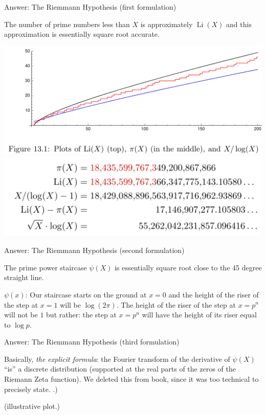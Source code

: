 \documentclass{beamer}
\DeclareMathOperator{\Li}{Li}
\begin{document}
\begin{frame}{Answer: The Riemmann Hypothesis (first formulation)}
  \begin{block}{}
    The number of prime numbers less than $X$ is
    approximately $\Li(X)$ and this approximation is essentially square
    root accurate.
  \end{block}
  \begin{center}
    \includegraphics[width=.5\textwidth]{pics/plot-pi-Li.png}
    \includegraphics[width=.5\textwidth]{pics/ten24.png}
  \end{center}
\end{frame}

\begin{frame}{Answer: The Riemmann Hypothesis  (second formulation)}
  \begin{block}{}
    The prime power staircase $\psi(X)$ is essentially square root close
    to the 45 degree straight line.
  \end{block}

  $\psi(x)$: Our staircase starts on the ground at $x=0$ and the height of the
  riser of the step at $x=1$ will be $\log(2\pi)$. The height of the
  riser of the step at $x=p^n$ will not be $1$
  but rather: the step at $x=p^n$ will have the height of its riser
  equal to $\log p$.


\end{frame}

\begin{frame}{Answer: The Riemmann Hypothesis (third formulation)}
  \begin{block}{}
    Basically, \textit{the explicit formula}: the Fourier transform
    of the derivative of $\psi(X)$ ``is'' a discrete distribution (supported
    at the real parts of the zeros of the Riemann Zeta function).
    We deleted this from book, since it was too technical
    to precisely state.  .)
  \end{block}

  (illustrative plot.)


\end{frame}
\end{document}
